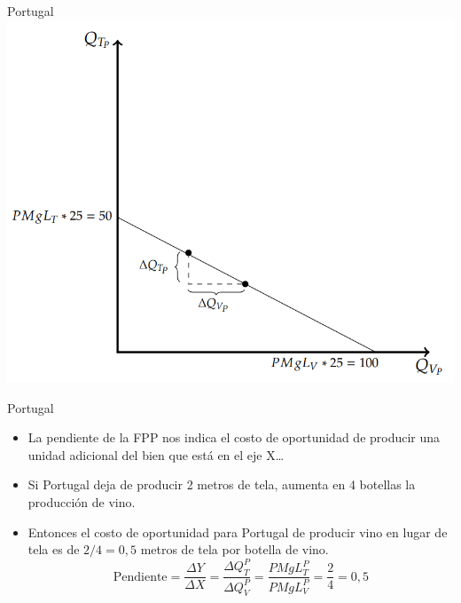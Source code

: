 \documentclass{beamer}
\begin{document}
\begin{frame}{Portugal}
    \centering
    \includegraphics[scale=0.6]{../Figures/C18.2.png}
\end{frame}

\begin{frame}{Portugal}
    \begin{itemize}
        \item La pendiente de la FPP nos indica el costo de oportunidad de producir una unidad adicional del bien que está en el eje X\dots
        \item Si Portugal deja de producir 2 metros de tela, aumenta en 4 botellas la producción de vino.
        \item Entonces el costo de oportunidad para Portugal de producir vino en lugar de tela es de $2/4 = 0,5$ metros de tela por botella de vino.
        \[ \text{Pendiente} = \frac{\Delta Y}{\Delta X} = \frac{\Delta Q^{P}_T}{\Delta Q^{P}_V} = \frac{PMgL_T^{P}}{PMgL_V^{P}} = \frac{2}{4} = 0,5 \]
    \end{itemize}
\end{frame}
\end{document}
